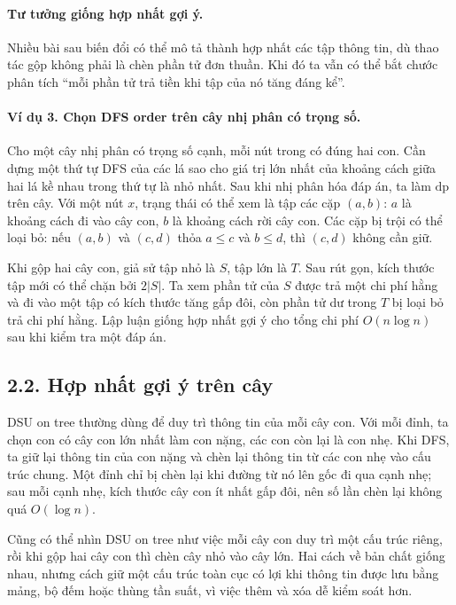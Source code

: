 \documentclass[11pt]{article}
\begin{document}
\paragraph{Tư tưởng giống hợp nhất gợi ý.}
Nhiều bài sau biến đổi có thể mô tả thành hợp nhất các tập thông tin, dù thao
tác gộp không phải là chèn phần tử đơn thuần. Khi đó ta vẫn có thể bắt chước
phân tích ``mỗi phần tử trả tiền khi tập của nó tăng đáng kể''.

\paragraph{Ví dụ 3. Chọn DFS order trên cây nhị phân có trọng số.}
Cho một cây nhị phân có trọng số cạnh, mỗi nút trong có đúng hai con. Cần dựng
một thứ tự DFS của các lá sao cho giá trị lớn nhất của khoảng cách giữa hai lá
kề nhau trong thứ tự là nhỏ nhất. Sau khi nhị phân hóa đáp án, ta làm
\(\mathrm{dp}\) trên cây. Với một nút \(x\), trạng thái có thể xem là tập các
cặp \((a,b)\): \(a\) là khoảng cách đi vào cây con, \(b\) là khoảng cách rời
cây con. Các cặp bị trội có thể loại bỏ: nếu
\((a,b)\) và \((c,d)\) thỏa \(a\le c\) và \(b\le d\), thì \((c,d)\) không cần
giữ.

Khi gộp hai cây con, giả sử tập nhỏ là \(S\), tập lớn là \(T\). Sau rút gọn,
kích thước tập mới có thể chặn bởi \(2|S|\). Ta xem phần tử của \(S\) được trả
một chi phí hằng và đi vào một tập có kích thước tăng gấp đôi, còn phần tử dư
trong \(T\) bị loại bỏ trả chi phí hằng. Lập luận giống hợp nhất gợi ý cho tổng
chi phí \(O(n\log n)\) sau khi kiểm tra một đáp án.

\subsection*{2.2. Hợp nhất gợi ý trên cây}

DSU on tree thường dùng để duy trì thông tin của mỗi cây con. Với mỗi đỉnh, ta
chọn con có cây con lớn nhất làm con nặng, các con còn lại là con nhẹ. Khi DFS,
ta giữ lại thông tin của con nặng và chèn lại thông tin từ các con nhẹ vào cấu
trúc chung. Một đỉnh chỉ bị chèn lại khi đường từ nó lên gốc đi qua cạnh nhẹ;
sau mỗi cạnh nhẹ, kích thước cây con ít nhất gấp đôi, nên số lần chèn lại không
quá \(O(\log n)\).

Cũng có thể nhìn DSU on tree như việc mỗi cây con duy trì một cấu trúc riêng,
rồi khi gộp hai cây con thì chèn cây nhỏ vào cây lớn. Hai cách về bản chất
giống nhau, nhưng cách giữ một cấu trúc toàn cục có lợi khi thông tin được lưu
bằng mảng, bộ đếm hoặc thùng tần suất, vì việc thêm và xóa dễ kiểm soát hơn.
\end{document}
